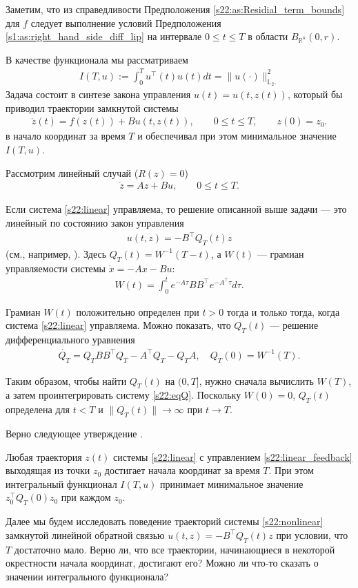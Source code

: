 \documentclass[../main.tex]{subfiles}
\begin{document}
Заметим, что из справедливости Предположения \ref{s22:as:Residial_term_bounds} для $f$ следует выполнение условий Предположения \ref{s1:as:right_hand_side_diff_lip} на интервале $ 0 \leqslant t \leqslant T$ в области $B_{\mathbb{R}^n}(0,r)$.

В качестве функционала мы рассматриваем 
\begin{gather}\label{s22:cost}
 I(T,u):=\int_0^Tu^\top (t)u(t)dt= \lVert u(\cdot)\rVert^2_{\mathbb{L}_2.} 
\end{gather}
Задача состоит в синтезе закона управления $u(t)=u(t,z(t))$, который бы приводил траектории замкнутой системы 
\begin{gather*}
 \dot{z}(t)=f(z(t))+B u(t,z(t)),\qquad 0 \leqslant t \leqslant T, \qquad z(0) = z_0.
\end{gather*}
в начало координат за время $T$ и обеспечивал при этом минимальное значение $I(T,u)$. 

Рассмотрим линейный случай ($R(z)=0$)
\begin{gather}\label{s22:linear}
 \dot{z} = A z + B u, \qquad 0 \leqslant t \leqslant T.
\end{gather}

Если система \eqref{s22:linear} управляема, то решение описанной выше задачи --- это линейный по состоянию закон управления 
\begin{gather}\label{s22:linear_feedback}
 u(t,z) = -B^{\top} Q_T(t) z
\end{gather}
(см., например, \cite{Abgar,Kur1,GusevOsipov}).
Здесь $Q_T(t)=W^{-1}(T-t)$, а $W(t)$ --- грамиан управляемости системы $\dot{x} = -A x - B u$:
\begin{gather*}
 W(t) = \int_0^t e^{-A\tau}BB^\top e^{-A^{\top}\tau}d\tau. 
\end{gather*}

Грамиан $W(t)$ положительно определен при $t>0$ тогда и только тогда, когда 
система \eqref{s22:linear} управляема. 
Можно показать, что $Q_T(t)$ --- решение дифференциального уравнения 
\begin{gather}\label{s22:eqQ}
 \dot{Q_T} = Q_T B B^{\top} Q_T - A^{\top}Q_T - Q_T A, \quad Q_T(0)=W^{-1}(T).
\end{gather}

Таким образом, чтобы найти $Q_T(t)$ на $(0,T]$, нужно сначала вычислить $W(T)$, а затем проинтегрировать систему \eqref{s22:eqQ}.
Поскольку $W(0)=0$, $Q_T(t)$ определена для $t<T$ и $\|Q_T(t)\| \to \infty$ при $t\to T$. 

Верно следующее утверждение \cite{Abgar,Kur1,GusevOsipov}.
\begin{utv}
Любая траектория $z(t)$ системы \eqref{s22:linear} с управлением \eqref{s22:linear_feedback} выходящая из точки $ z_0 $ достигает начала координат за время $T$. 
При этом интегральный функционал $I(T,u)$ принимает минимальное значение $z^{\top}_0 Q_T(0) z_0 $ при каждом $z_0$.
\end{utv}
Далее мы будем исследовать поведение траекторий системы \eqref{s22:nonlinear} замкнутой линейной обратной связью $ u(t,z) = -B^{\top} Q_T(t) z$ при условии, что $T$ достаточно мало. 
Верно ли, что все траектории, начинающиеся в некоторой окрестности начала координат, достигают его? 
Можно ли что-то сказать о значении интегрального функционала? 
\end{document}
